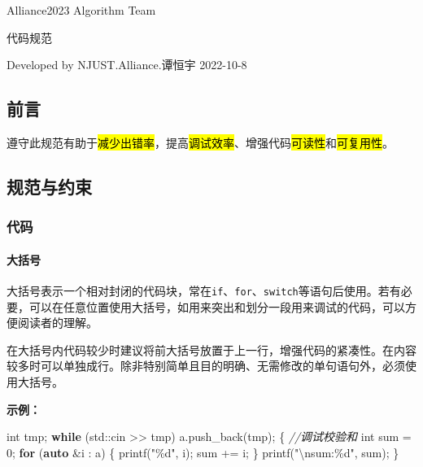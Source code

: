 \documentclass[
]{article}
\author{}
\date{}
\newenvironment{Shaded}{}{}
\newcommand{\BuiltInTok}[1]{\textcolor[rgb]{0.00,0.50,0.00}{#1}}
\newcommand{\CommentTok}[1]{\textcolor[rgb]{0.38,0.63,0.69}{\textit{#1}}}
\newcommand{\ControlFlowTok}[1]{\textcolor[rgb]{0.00,0.44,0.13}{\textbf{#1}}}
\newcommand{\DataTypeTok}[1]{\textcolor[rgb]{0.56,0.13,0.00}{#1}}
\newcommand{\DecValTok}[1]{\textcolor[rgb]{0.25,0.63,0.44}{#1}}
\newcommand{\KeywordTok}[1]{\textcolor[rgb]{0.00,0.44,0.13}{\textbf{#1}}}
\newcommand{\NormalTok}[1]{#1}
\newcommand{\OperatorTok}[1]{\textcolor[rgb]{0.40,0.40,0.40}{#1}}
\newcommand{\SpecialCharTok}[1]{\textcolor[rgb]{0.25,0.44,0.63}{#1}}
\newcommand{\StringTok}[1]{\textcolor[rgb]{0.25,0.44,0.63}{#1}}
\begin{document}
Alliance2023 Algorithm Team

代码规范

Developed by NJUST.Alliance.谭恒宇 2022-10-8

\hypertarget{ux524dux8a00}{%
\subsection{前言}\label{ux524dux8a00}}

遵守此规范有助于\hl{减少出错率}，提高\hl{调试效率}、增强代码\hl{可读性}和\hl{可复用性}。

\hypertarget{ux89c4ux8303ux4e0eux7ea6ux675f}{%
\subsection{规范与约束}\label{ux89c4ux8303ux4e0eux7ea6ux675f}}

\hypertarget{ux4ee3ux7801}{%
\subsubsection{代码}\label{ux4ee3ux7801}}

\hypertarget{ux5927ux62ecux53f7}{%
\paragraph{大括号}\label{ux5927ux62ecux53f7}}

大括号表示一个相对封闭的代码块，常在\texttt{if}、\texttt{for}、\texttt{switch}等语句后使用。若有必要，可以在任意位置使用大括号，如用来突出和划分一段用来调试的代码，可以方便阅读者的理解。

在大括号内代码较少时建议将前大括号放置于上一行，增强代码的紧凑性。在内容较多时可以单独成行。除非特别简单且目的明确、无需修改的单句语句外，必须使用大括号。

\textbf{示例：}

\begin{Shaded}
\begin{Highlighting}[]
\DataTypeTok{int}\NormalTok{ tmp}\OperatorTok{;}
\ControlFlowTok{while} \OperatorTok{(}\BuiltInTok{std::}\NormalTok{cin}\OperatorTok{ \textgreater{}\textgreater{}}\NormalTok{ tmp}\OperatorTok{)}
\NormalTok{	a}\OperatorTok{.}\NormalTok{push\_back}\OperatorTok{(}\NormalTok{tmp}\OperatorTok{);}
\OperatorTok{\{} \CommentTok{//调试校验和}
	\DataTypeTok{int}\NormalTok{ sum }\OperatorTok{=} \DecValTok{0}\OperatorTok{;}
	\ControlFlowTok{for} \OperatorTok{(}\KeywordTok{auto} \OperatorTok{\&}\NormalTok{i }\OperatorTok{:}\NormalTok{ a}\OperatorTok{)} \OperatorTok{\{}
\NormalTok{		printf}\OperatorTok{(}\StringTok{"}\SpecialCharTok{\%d}\StringTok{"}\OperatorTok{,}\NormalTok{ i}\OperatorTok{);}
\NormalTok{		sum }\OperatorTok{+=}\NormalTok{ i}\OperatorTok{;}
	\OperatorTok{\}}
\NormalTok{	printf}\OperatorTok{(}\StringTok{"}\SpecialCharTok{\textbackslash{}n}\StringTok{sum:}\SpecialCharTok{\%d}\StringTok{"}\OperatorTok{,}\NormalTok{ sum}\OperatorTok{);}
\OperatorTok{\}}
\end{Highlighting}
\end{Shaded}
\end{document}

